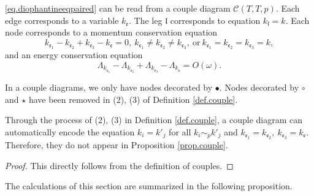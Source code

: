  
 \begin{prop}\label{prop.couple}
 \eqref{eq.diophantineeqpaired} can be read from a couple diagram $\mathcal{C}(T,T,p)$. Each edge corresponds to a variable $k_{\mathfrak{e}}$. The leg $\mathfrak{l}$ corresponds to equation $k_{\mathfrak{l}}=k$. Each node corresponds to a momentum conservation equation
 \begin{equation}
  k_{\mathfrak{e}_1}-k_{\mathfrak{e}_2}+k_{\mathfrak{e}_3}-k_{\mathfrak{e}}=0,\ k_{\mathfrak{e}_1}\ne k_{\mathfrak{e}_2}\ne k_{\mathfrak{e}_3},\ \text{or}\ k_{\mathfrak{e}_1}= k_{\mathfrak{e}_2}= k_{\mathfrak{e}_3}=k,
 \end{equation} 
 and an energy conservation equation 
 \begin{equation}
  \Lambda_{k_{\mathfrak{e}_1}}-\Lambda_{k_{\mathfrak{e}_2}}+\Lambda_{k_{\mathfrak{e}_3}}-\Lambda_{k_{\mathfrak{e}}} = O(\omega).
 \end{equation} 
 \end{prop}
 \begin{rem}
 In a couple diagrams, we only have nodes decorated by $\bullet$. Nodes decorated by $\circ$ and $\star$ have been removed in (2), (3) of Definition \ref{def.couple}.
 \end{rem}
 \begin{rem}
 Through the process of (2), (3) in Definition \ref{def.couple}, a couple diagram can automatically encode the equation $k_{i}=k'_{j}$ for all $k_{i}\sim_{p}k'_{j}$ and $k_{\mathfrak{e}_1}=k_{\mathfrak{e}_2},\ k_{\mathfrak{e}_3}=k_{\mathfrak{e}}$. Therefore, they do not appear in Proposition \ref{prop.couple}.
 \end{rem}
 
 \begin{proof}
 This directly follows from the definition of couples. 
 \end{proof}
 
 The calculations of this section are summarized in the following proposition. 
 
